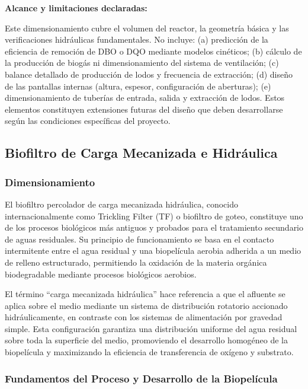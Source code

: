 \documentclass[12pt,a4paper]{article}
\begin{document}
\textbf{Alcance y limitaciones declaradas:}

Este dimensionamiento cubre el volumen del reactor, la geometría básica y las verificaciones hidráulicas fundamentales. No incluye: (a) predicción de la eficiencia de remoción de DBO o DQO mediante modelos cinéticos; (b) cálculo de la producción de biogás ni dimensionamiento del sistema de ventilación; (c) balance detallado de producción de lodos y frecuencia de extracción; (d) diseño de las pantallas internas (altura, espesor, configuración de aberturas); (e) dimensionamiento de tuberías de entrada, salida y extracción de lodos. Estos elementos constituyen extensiones futuras del diseño que deben desarrollarse según las condiciones específicas del proyecto.

\subsection{Biofiltro de Carga Mecanizada e Hidráulica}

\subsubsection{Dimensionamiento}

El biofiltro percolador de carga mecanizada hidráulica, conocido internacionalmente como Trickling Filter (TF) o biofiltro de goteo, constituye uno de los procesos biológicos más antiguos y probados para el tratamiento secundario de aguas residuales. Su principio de funcionamiento se basa en el contacto intermitente entre el agua residual y una biopelícula aerobia adherida a un medio de relleno estructurado, permitiendo la oxidación de la materia orgánica biodegradable mediante procesos biológicos aerobios.

El término ``carga mecanizada hidráulica'' hace referencia a que el afluente se aplica sobre el medio mediante un sistema de distribución rotatorio accionado hidráulicamente, en contraste con los sistemas de alimentación por gravedad simple. Esta configuración garantiza una distribución uniforme del agua residual sobre toda la superficie del medio, promoviendo el desarrollo homogéneo de la biopelícula y maximizando la eficiencia de transferencia de oxígeno y substrato.

\subsubsection*{Fundamentos del Proceso y Desarrollo de la Biopelícula}
\end{document}
